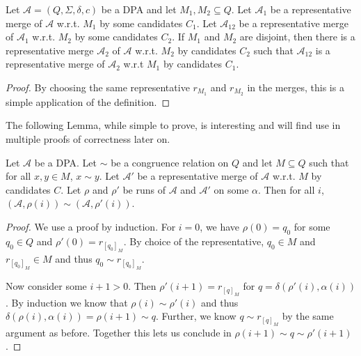 \begin{lem}
	Let $\mathcal{A} = (Q, \Sigma, \delta, c)$ be a DPA and let $M_1, M_2 \subseteq Q$. Let $\mathcal{A}_1$ be a representative merge of $\mathcal{A}$ w.r.t. $M_1$ by some candidates $C_1$. Let $\mathcal{A}_{12}$ be a representative merge of $\mathcal{A}_1$ w.r.t. $M_2$ by some candidates $C_2$. If $M_1$ and $M_2$ are disjoint, then there is a representative merge $\mathcal{A}_2$ of $\mathcal{A}$ w.r.t. $M_2$ by candidates $C_2$ such that $\mathcal{A}_{12}$ is a representative merge of $\mathcal{A}_2$ w.r.t $M_1$ by candidates $C_1$.
\end{lem}

\begin{proof}
	By choosing the same representative $r_{M_1}$ and $r_{M_2}$ in the merges, this is a simple application of the definition.
\end{proof}


\vspace{10pt}

The following Lemma, while simple to prove, is interesting and will find use in multiple proofs of correctness later on.

\begin{lem}
	Let $\mathcal{A}$ be a DPA. Let $\sim$ be a congruence relation on $Q$ and let $M \subseteq Q$ such that for all $x, y \in M$, $x \sim y$. Let $\mathcal{A}'$ be a representative merge of $\mathcal{A}$ w.r.t. $M$ by candidates $C$. Let $\rho$ and $\rho'$ be runs of $\mathcal{A}$ and $\mathcal{A}'$ on some $\alpha$. Then for all $i$, $(\mathcal{A}, \rho(i)) \sim (\mathcal{A}, \rho'(i))$.
	\label{lem:general:cong_stays_in_merge}
\end{lem}

\begin{proof}
	We use a proof by induction. For $i = 0$, we have $\rho(0) = q_0$ for some $q_0 \in Q$ and $\rho'(0) = r_{[q_0]_M}$. By choice of the representative, $q_0 \in M$ and $r_{[q_0]_M} \in M$ and thus $q_0 \sim r_{[q_0]_M}$.
	
	Now consider some $i+1 > 0$. Then $\rho'(i+1) = r_{[q]_M}$ for $q = \delta(\rho'(i), \alpha(i))$. By induction we know that $\rho(i) \sim \rho'(i)$ and thus $\delta(\rho(i), \alpha(i)) = \rho(i+1) \sim q$. Further, we know $q \sim r_{[q]_M}$ by the same argument as before. Together this lets us conclude in $\rho(i+1) \sim q \sim \rho'(i+1)$.
\end{proof}

\vspace{10pt}

